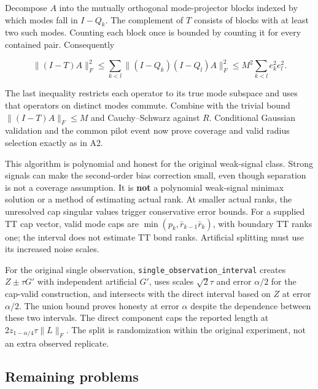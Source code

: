 Decompose \(A\) into the mutually orthogonal mode-projector blocks
indexed by which modes fall in \(I-Q_k\). The complement of \(T\)
consists of blocks with at least two such modes. Counting each block
once is bounded by counting it for every contained pair. Consequently

\[\|(I-T)A\|_F^2\le\sum_{k<l}
\|(I-Q_k)(I-Q_l)A\|_F^2
\le M^2\sum_{k<l}e_k^2e_l^2.\]

The last inequality restricts each operator to its true mode subspace
and uses that operators on distinct modes commute. Combine with the
trivial bound \(\|(I-T)A\|_F\le M\) and Cauchy--Schwarz against \(R\).
Conditional Gaussian validation and the common pilot event now prove
coverage and valid radius selection exactly as in A2.

This algorithm is polynomial and honest for the original weak-signal
class. Strong signals can make the second-order bias correction small,
even though separation is not a coverage assumption. It is \textbf{not}
a polynomial weak-signal minimax solution or a method of estimating
actual rank. At smaller actual ranks, the unresolved cap singular values
trigger conservative error bounds. For a supplied TT cap vector, valid
mode caps are \(\min(p_k,\bar r_{k-1}\bar r_k)\), with boundary TT ranks
one; the interval does not estimate TT bond ranks. Artificial splitting
must use its increased noise scales.

For the original single observation,
\texttt{single\_observation\_interval} creates \(Z\pm\tau G'\) with
independent artificial \(G'\), uses scales \(\sqrt2\tau\) and error
\(\alpha/2\) for the cap-valid construction, and intersects with the
direct interval based on \(Z\) at error \(\alpha/2\). The union bound
proves honesty at error \(\alpha\) despite the dependence between these
two intervals. The direct component caps the reported length at
\(2z_{1-\alpha/4}\tau\|L\|_F\). The split is randomization within the
original experiment, not an extra observed replicate.

\subsection{Remaining problems}\label{remaining-problems}

